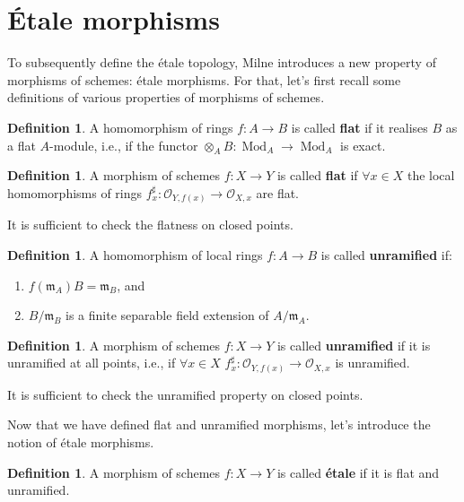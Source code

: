 \documentclass{report}
\DeclareMathOperator{\Mod}{Mod}
\theoremstyle{definition}
\newtheorem{definition}[theorem]{Definition}
\begin{document}
\section{\'{E}tale morphisms}

To subsequently define the \'{e}tale topology, Milne \cite[Section~I.2]{milne2013lectures} introduces a new property of morphisms of schemes: \'{e}tale morphisms. For that, let's first recall some definitions of various properties of morphisms of schemes.

\begin{definition}
A homomorphism of rings $f:A\rightarrow B$ is called \textbf{flat} if it realises $B$ as a flat $A$-module, i.e., if the functor $\otimes_AB:\Mod_A\rightarrow\Mod_A$ is exact.
\end{definition}

\begin{definition}
A morphism of schemes $f:X\rightarrow Y$ is called \textbf{flat} if $\forall x\in X$ the local homomorphisms of rings $f_x^{\sharp}:\mathcal{O}_{Y,f(x)}\rightarrow\mathcal{O}_{X,x}$ are flat.

It is sufficient to check the flatness on closed points.
\end{definition}

\begin{definition}
A homomorphism of local rings $f:A\rightarrow B$ is called \textbf{unramified} if:
\begin{enumerate}
\item $f(\mathfrak{m}_A)B=\mathfrak{m}_B$, and
\item $B/\mathfrak{m}_B$ is a finite separable field extension of $A/\mathfrak{m}_A$.
\end{enumerate}
\end{definition}

\begin{definition}
A morphism of schemes $f:X\rightarrow Y$ is called \textbf{unramified} if it is unramified at all points, i.e., if $\forall x\in X$ $f_x^{\sharp}:\mathcal{O}_{Y,f(x)}\rightarrow\mathcal{O}_{X,x}$ is unramified.

It is sufficient to check the unramified property on closed points.
\end{definition}

Now that we have defined flat and unramified morphisms, let's introduce the notion of \'{e}tale morphisms.

\begin{definition}
A morphism of schemes $f:X\rightarrow Y$ is called \textbf{\'{e}tale} if it is flat and unramified.
\end{definition}
\end{document}
